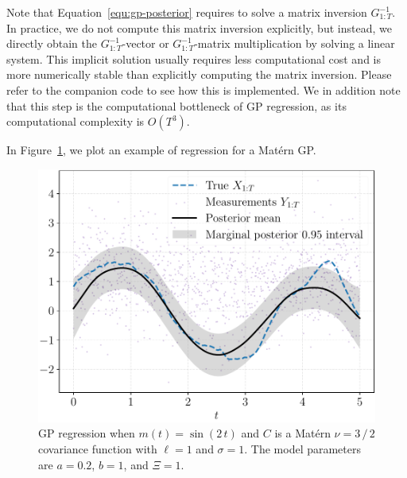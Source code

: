 \documentclass[]{article}
\begin{document}
Note that Equation~\eqref{equ:gp-posterior} requires to solve a matrix inversion $G_{1:T}^{-1}$. In practice, we do not compute this matrix inversion explicitly, but instead, we directly obtain the $G_{1:T}^{-1}$-vector or $G_{1:T}^{-1}$-matrix multiplication by solving a linear system. This implicit solution usually requires less computational cost and is more numerically stable than explicitly computing the matrix inversion. Please refer to the companion code to see how this is implemented. We in addition note that this step is the computational bottleneck of GP regression, as its computational complexity is $O(T^3)$.

In Figure~\ref{fig:regression}, we plot an example of regression for a Mat\'{e}rn GP.

\begin{figure}[t!]
	\centering
	\includegraphics[width=.6\linewidth]{figs/regression}
	\caption{GP regression when $m(t) = \sin(2 \, t)$ and $C$ is a Mat\'{e}rn $\nu=3 \, / \, 2$ covariance function with $\ell=1$ and $\sigma=1$. The model parameters are $a=0.2$, $b=1$, and $\Xi=1$.}
	\label{fig:regression}
\end{figure}
\end{document}
